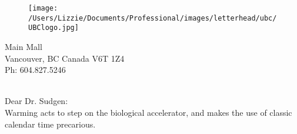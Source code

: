 \documentclass[11pt,a4paper]{article}
\begin{document}

\begin{figure}[htbp]
\hspace*{14cm}                                                           
\texttt{[image: /Users/Lizzie/Documents/Professional/images/letterhead/ubc/UBClogo.jpg]}
\end{figure}
\vspace{-10ex}
\begin{small}
 Main Mall \\
\noindent Vancouver, BC Canada V6T 1Z4\\
\noindent Ph: 604.827.5246\\
\end{small}
\vspace{2ex}\\
\noindent Dear Dr. Sudgen:
\vspace{1.5ex}\\
Warming acts to step on the biological accelerator, and makes the use of classic calendar time precarious.
\end{document}
